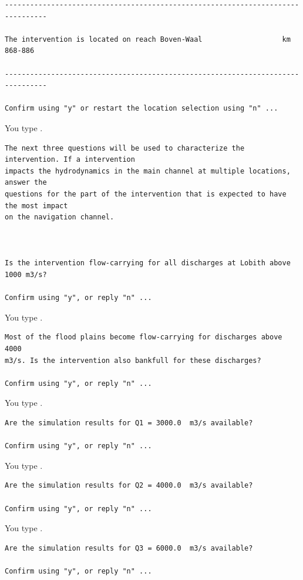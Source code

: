 \begin{Verbatim}
--------------------------------------------------------------------------------

The intervention is located on reach Boven-Waal                   km  868-886

--------------------------------------------------------------------------------

Confirm using "y" or restart the location selection using "n" ...
\end{Verbatim}

You type .

\begin{Verbatim}
The next three questions will be used to characterize the intervention. If a intervention
impacts the hydrodynamics in the main channel at multiple locations, answer the
questions for the part of the intervention that is expected to have the most impact
on the navigation channel.



Is the intervention flow-carrying for all discharges at Lobith above 1000 m3/s?

Confirm using "y", or reply "n" ...
\end{Verbatim}

You type .

\begin{Verbatim}
Most of the flood plains become flow-carrying for discharges above 4000
m3/s. Is the intervention also bankfull for these discharges?

Confirm using "y", or reply "n" ...
\end{Verbatim}

You type .

\begin{Verbatim}
Are the simulation results for Q1 = 3000.0  m3/s available?

Confirm using "y", or reply "n" ...
\end{Verbatim}

You type .

\begin{Verbatim}
Are the simulation results for Q2 = 4000.0  m3/s available?

Confirm using "y", or reply "n" ...
\end{Verbatim}

You type .

\begin{Verbatim}
Are the simulation results for Q3 = 6000.0  m3/s available?

Confirm using "y", or reply "n" ...
\end{Verbatim}

